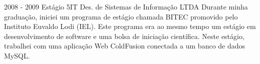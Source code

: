     {}
    {}
    {}
\cvevent
    {2008 - 2009}
    {Estágio}
    {5IT Des. de Sistemas de Informação LTDA}
    {Durante minha graduação, iniciei um programa de estágio chamada BITEC promovido pelo Instituto Euvaldo Lodi (IEL). Este programa era ao mesmo tempo um estágio em desenvolvimento de software e uma bolsa de iniciação científica. Neste estágio, trabalhei com uma aplicação Web ColdFusion conectada a um banco de dados MySQL.}
    {}
    {}
    {}
